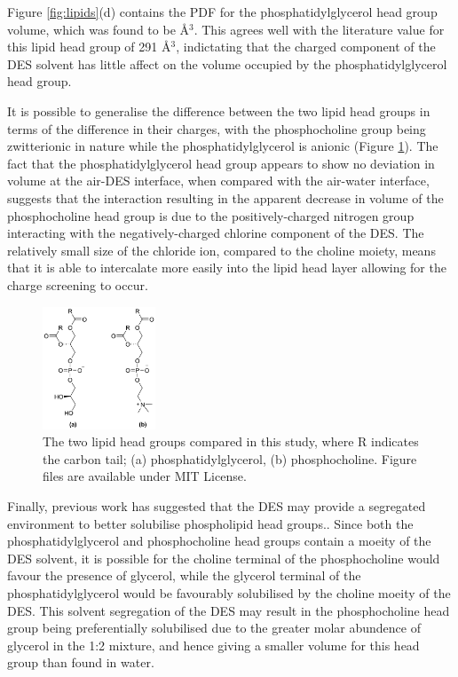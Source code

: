 \documentclass[twoside,twocolumn,9pt]{article}
\begin{document}
Figure \ref{fig:lipids}(d) contains the PDF for the phosphatidylglycerol head group volume, which was found to be  \AA$^{3}$. This agrees well with the literature value for this lipid head group of 291 \AA$^{3}$,\cite{Pan2012} indictating that the charged component of the DES solvent has little affect on the volume occupied by the phosphatidylglycerol head group. 

It is possible to generalise the difference between the two lipid head groups in terms of the difference in their charges, with the phosphocholine group being zwitterionic in nature while the phosphatidylglycerol is anionic (Figure \ref{fig:heads}). The fact that the phosphatidylglycerol head group appears to show no deviation in volume at the air-DES interface, when compared with the air-water interface, suggests that the interaction resulting in the apparent decrease in volume of the phosphocholine head group is due to the positively-charged nitrogen group interacting with the negatively-charged chlorine component of the DES. The relatively small size of the chloride ion, compared to the choline moiety, means that it is able to intercalate more easily into the lipid head layer allowing for the charge screening to occur. 

\begin{figure}
	\centering
	\includegraphics[width=0.30\textwidth]{figures/head_groups}
	\caption{The two lipid head groups compared in this study, where R indicates the carbon tail; (a) phosphatidylglycerol, (b) phosphocholine. Figure files are available under MIT License.\cite{mccluskey_2018}}
	\label{fig:heads}
\end{figure}

Finally, previous work has suggested that the DES may provide a segregated environment to better solubilise phospholipid head groups.\cite{Bryant2016,Bryant2017}. Since both the phosphatidylglycerol and phosphocholine head groups contain a moeity of the DES solvent, it is possible for the choline terminal of the phosphocholine would favour the presence of glycerol, while the glycerol terminal of the phosphatidylglycerol would be favourably solubilised by the choline moeity of the DES. This solvent segregation of the DES may result in the phosphocholine head group being preferentially solubilised due to the greater molar abundence of glycerol in the 1:2 mixture, and hence giving a smaller volume for this head group than found in water.
\end{document}
